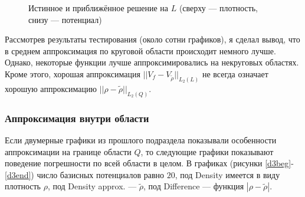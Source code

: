 \documentclass[a4paper]{article}
\begin{document}
\begin{figure}[h]
  \vfill
  \caption{Истинное и приближённое решение на $L$ (сверху --- плотность, снизу --- потенциал)}
  \label{hexampl}
\end{figure}

Рассмотрев результаты тестирования (около сотни графиков), я сделал вывод, что в среднем аппроксимация по круговой области происходит немного лучше.
Однако, некоторые функции лучше аппроксимировались на некруговых областях.
Кроме этого, хорошая аппроксимация $||V_f-V_{\tilde{\rho} } ||_{L_2(L)}$ не всегда означает хорошую аппроксимацию $||\rho-\tilde{\rho} ||_{L_2(Q)}$.%

\FloatBarrier
\subsubsection{Аппроксимация внутри области}
Если двумерные графики из прошлого подраздела показывали особенности аппроксимации на границе области $Q$, то следующие графики показывают поведение погрешности по всей области в целом.
В графиках (рисунки \ref{d3beg}-\ref{d3end}) число базисных потенциалов равно $20$, под Density имеется в виду плотность $\rho$, под Density approx. --- $\tilde{\rho}$, под Difference --- функция $|\rho-\tilde{\rho}|$.
\end{document}
